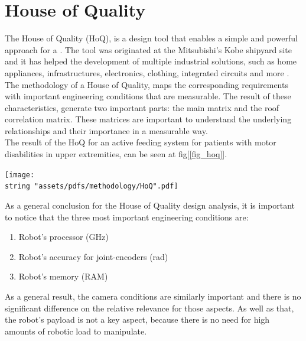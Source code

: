 \documentclass[11pt]{report} %
\begin{document}
\section{House of Quality}

The House of Quality (HoQ), is a design tool that enables a simple and powerful approach for a . The tool was originated at the Mitsubishi’s Kobe shipyard site and it has helped the development of multiple industrial solutions, such as home appliances, infrastructures, electronics, clothing, integrated circuits and more \citep{cite_house_of_quality}.\\

The methodology of a House of Quality, maps the corresponding requirements with important engineering conditions that are measurable. The result of these characteristics, generate two important parts: the main matrix and the roof correlation matrix. These matrices are important to understand the underlying relationships and their importance in a measurable way.\\

The result of the HoQ for an active feeding system for patients with motor disabilities in upper extremities, can be seen at fig[\ref{fig_hoq}].\\

\begin{center}
    \texttt{[image: \\string "assets/pdfs/methodology/HoQ".pdf]}
    \bigbreak
    \begin{minipage}{\linewidth} %
    \label{fig_hoq}
\end{minipage} \end{center}

As a general conclusion for the House of Quality design analysis, it is important to notice that the three most important engineering conditions are:\\

\begin{enumerate}
    \item Robot's processor (GHz)
    \item Robot's accuracy for joint-encoders (rad)
    \item Robot's memory (RAM)
\end{enumerate}

As a general result, the camera conditions are similarly important and there is no significant difference on the relative relevance for those aspects. As well as that, the robot's payload is not a key aspect, because there is no need for high amounts of robotic load to manipulate.\\
\end{document}
